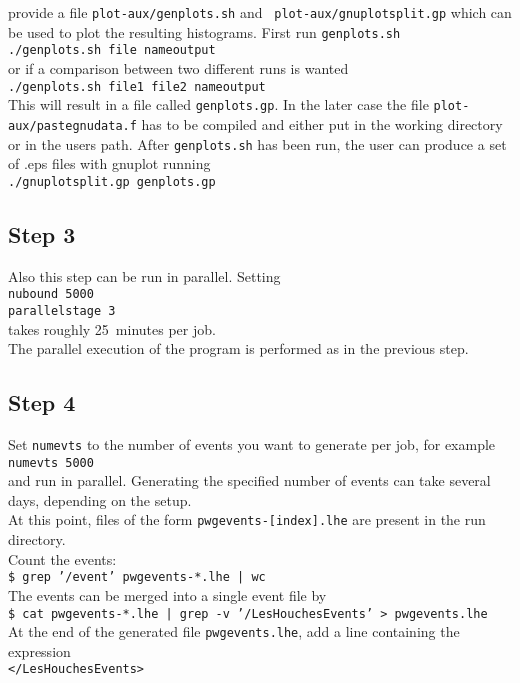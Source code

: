 \documentclass[a4paper,11pt]{article}
\begin{document}
provide a file {\tt plot-aux/genplots.sh} and {\tt
  plot-aux/gnuplotsplit.gp} which can be used to plot the resulting
histograms. First run {\tt genplots.sh}
\\[2ex]
{\tt ./genplots.sh file nameoutput}
\\[2ex]
or if a comparison between two different runs is wanted
\\[2ex]
{\tt ./genplots.sh file1 file2 nameoutput}
\\[2ex]
This will result in a file called {\tt genplots.gp}. In the later case
the file {\tt plot-aux/pastegnudata.f} has to be compiled and either put
in the working directory or in the users
path. After {\tt genplots.sh} has been run, the user can produce a set
of .eps files with gnuplot running
\\[2ex]
{\tt ./gnuplotsplit.gp genplots.gp}
\\[2ex]
\subsection*{Step 3}
%
Also this step can be run in parallel. 
Setting
\\[2ex]
{\tt nubound 5000}
\\
{\tt parallelstage  3}
\\[2ex]
takes roughly 25~minutes per job.
\\[2ex] 
The parallel execution of the program is
performed as in the previous step.

\subsection*{Step 4}
%
Set {\tt numevts} to the number of events you want to generate per
job, for example
\\[2ex]
{\tt numevts 5000} 
\\[2ex]
and run in parallel. 
Generating the specified number of
events can take several days, depending on the setup.
\\[2ex]
At this point, files of the form {\tt pwgevents-[index].lhe} are
present in the run directory.
\\[2ex]
Count the events:
\\[2ex]
{\tt \$ grep '/event' pwgevents-*.lhe | wc}
\\[2ex]
The events can be merged into a single event file by
\\[2ex]
{\tt \$ cat pwgevents-*.lhe | grep -v '/LesHouchesEvents' >
  pwgevents.lhe}
\\[2ex]
At the end of the generated file {\tt pwgevents.lhe}, add a line containing the expression
\\[2ex]
{\tt </LesHouchesEvents>}
\end{document}
